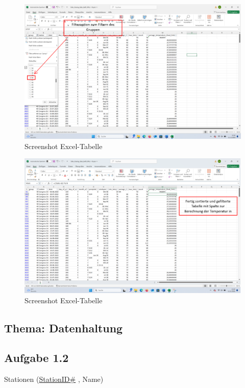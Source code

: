 \documentclass[a4paper, 12pt]{article}
\begin{document}
\newpage
\begin{figure}[!htb]
\centering
\includegraphics[scale=.4]{Screenshot 2024-11-26 201403}
\caption{Screenshot Excel-Tabelle}
\label{fig:Screenshot Excel-Tabelle}
\end{figure}

\begin{figure}[!htb]
\centering
\includegraphics[scale=.4]{Screenshot 2024-11-26 201421}
\caption{Screenshot Excel-Tabelle}
\label{fig:Screenshot Excel-Tabelle}
\end{figure}

\newpage
\subsection*{Thema: Datenhaltung}
\subsection{Aufgabe 1.2}
Stationen (\underline{StationID\#} , Name)
\\
\end{document}
